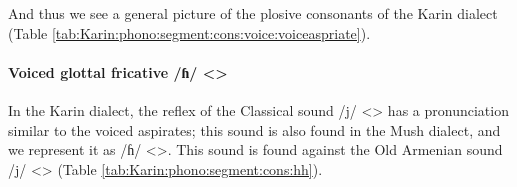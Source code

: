 And thus we see a general picture of the plosive consonants of the Karin dialect (Table \ref{tab:Karin:phono:segment:cons:voice:voiceaspriate}).

\begin{table}[H]
	\caption{Voiced aspirates in the Karin dialect}\label{tab:Karin:phono:segment:cons:voice:voiceaspriate}\centering 
{}
\end{table}

\paragraph{Voiced glottal fricative /ɦ/ <> }

In the Karin dialect, the reflex of the Classical sound /j/ <> has a pronunciation similar to the voiced aspirates; this sound is also found in the Mush dialect, and we represent it as /ɦ/ <>. This sound is found against the Old Armenian sound /j/ <> (Table \ref{tab:Karin:phono:segment:cons:hh}).




